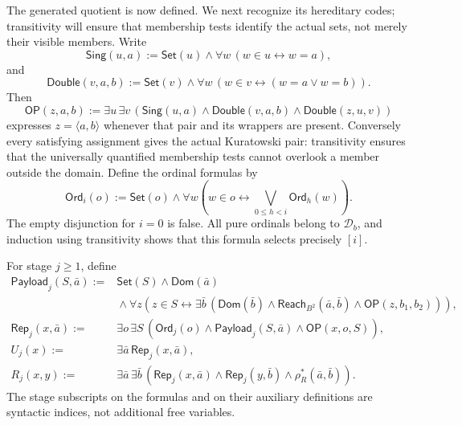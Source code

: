 The generated quotient is now defined. We next recognize its hereditary
codes; transitivity will ensure that membership tests identify the actual
sets, not merely their visible members. Write
\[
 \mathsf{Sing}(u,a):=\mathsf{Set}(u)\wedge
                  \forall w\,(w\in u\leftrightarrow w=a),
\]
and
\[
 \mathsf{Double}(v,a,b):=\mathsf{Set}(v)\wedge
               \forall w\,(w\in v\leftrightarrow(w=a\vee w=b)).
\]
Then
\[
 \mathsf{OP}(z,a,b):=
 \exists u\,\exists v\,
 (\mathsf{Sing}(u,a)\wedge\mathsf{Double}(v,a,b)
                         \wedge\mathsf{Double}(z,u,v))
\]
expresses $z=\langle a,b\rangle$ whenever that pair and its wrappers
are present. Conversely every satisfying assignment gives the actual
Kuratowski pair: transitivity ensures that the universally quantified
membership tests cannot overlook a member outside the domain.
Define the ordinal formulas by
\[
 \mathsf{Ord}_i(o):=\mathsf{Set}(o)\wedge
 \forall w\left(w\in o\leftrightarrow
                       \bigvee_{0\le h<i}\mathsf{Ord}_h(w)\right).
\]
The empty disjunction for $i=0$ is false. All pure ordinals belong to
$\mathcal D_b$, and induction using transitivity shows that this formula
selects precisely $[i]$.

For stage $j\ge1$, define
\begin{align*}
 \mathsf{Payload}_j(S,\bar a):={}&
 \mathsf{Set}(S)\wedge\mathsf{Dom}(\bar a)\\[-2pt]
 &{}\wedge\forall z\left(z\in S\leftrightarrow
  \exists\bar b\,
   (\mathsf{Dom}(\bar b)\wedge
    \mathsf{Reach}_{B^2}(\bar a,\bar b)
                      \wedge\mathsf{OP}(z,b_1,b_2))\right),\\
 \mathsf{Rep}_j(x,\bar a):={}&
 \exists o\,\exists S\,
  (\mathsf{Ord}_j(o)\wedge\mathsf{Payload}_j(S,\bar a)
                               \wedge\mathsf{OP}(x,o,S)),\\
 U_j(x):={}&\exists\bar a\,\mathsf{Rep}_j(x,\bar a),\\
 R_j(x,y):={}&\exists\bar a\,\exists\bar b\,
 (\mathsf{Rep}_j(x,\bar a)\wedge\mathsf{Rep}_j(y,\bar b)
                                      \wedge\rho_R^*(\bar a,\bar b)).
\end{align*}
The stage subscripts on the formulas and on their auxiliary definitions
are syntactic indices, not additional free variables.


